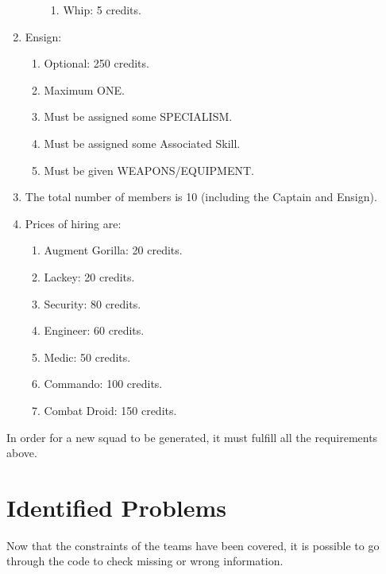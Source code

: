 \documentclass[12pt,a4paper]{article}
\begin{document}
\begin{enumerate}
\begin{enumerate}
\begin{enumerate}
				                                         \item Whip: 5 credits.
				                                        \end{enumerate}
                \end{enumerate}
 \item Ensign: \begin{enumerate}
                \item Optional: 250 credits.
                \item Maximum ONE.
                \item Must be assigned some SPECIALISM.
                \item Must be assigned some Associated Skill.
                \item Must be given WEAPONS/EQUIPMENT.
               \end{enumerate}
 \item The total number of members is 10 (including the Captain and Ensign).
 \item Prices of hiring are: \begin{enumerate}
                              \item Augment Gorilla: 20 credits.
                              \item Lackey: 20 credits.
                              \item Security: 80 credits.
                              \item Engineer: 60 credits.
                              \item Medic: 50 credits.
                              \item Commando: 100 credits.
                              \item Combat Droid: 150 credits.
                             \end{enumerate}
\end{enumerate}

In order for a new squad to be generated, it must fulfill all the requirements above. 




\section{Identified Problems}

Now that the constraints of the teams have been covered, it is possible to go through the code to check missing or wrong information.
\end{document}
